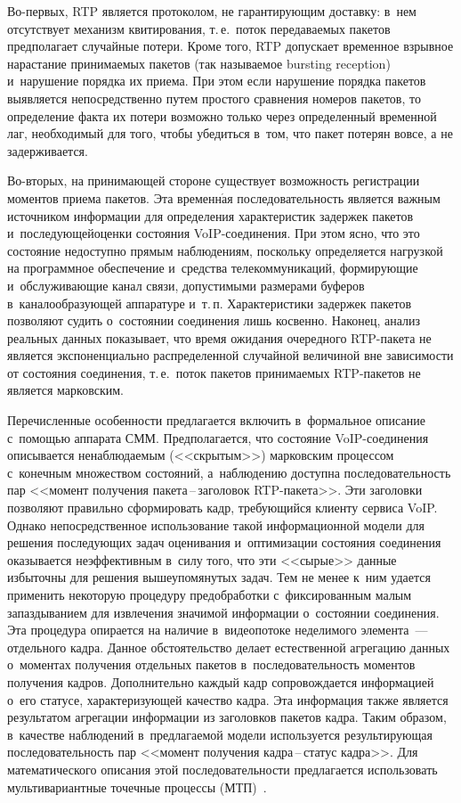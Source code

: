 \begin{multicols}{2}
Во-первых, RTP является протоколом, не гаран\-ти\-ру\-ющим доставку: в~нем
отсутствует механизм квитирования, т.\,е.\ поток передаваемых пакетов
предполагает случайные потери. Кроме того, RTP допускает временное
взрывное нарастание принимаемых пакетов (так называемое bursting reception) 
и~нарушение порядка их приема. При этом если нарушение порядка пакетов
выявляется непосредственно путем простого сравнения номеров пакетов,
то определение факта их потери возможно только через определенный
временной лаг, необходимый для того, чтобы убедиться в~том, что
пакет потерян вовсе, а не задерживается.

Во-вторых, на принимающей стороне существует возможность регистрации
моментов приема пакетов. Эта временн$\acute{\mbox{а}}$я последовательность является
важным источником информации для определения характеристик задержек
пакетов и~последующей\linebreak оценки состояния VoIP-со\-еди\-не\-ния. При этом
\mbox{ясно,} что это состояние недоступно прямым наблюдениям, поскольку
определяется нагрузкой на программное обеспечение и~средства
телекоммуникаций, формирующие и~обслуживающие канал связи,
допустимыми размерами буферов в~каналообразующей аппаратуре и~т.\,п.
Характеристики задержек пакетов позволяют судить о~состоянии
соединения лишь косвенно. Наконец, анализ реальных данных
показывает, что время ожидания очередного RTP-пакета не является
экспоненциально распределенной случайной величиной вне зависимости
от состояния соединения, т.\,е.\ поток пакетов принимаемых RTP-па\-ке\-тов
не является марковским.

Перечисленные особенности предлагается вклю\-чить в~формальное
описание с~помощью ап\-па\-ра\-та СММ. Предполагается, что состояние\linebreak
VoIP-со\-еди\-не\-ния описывается ненаблюдаемым (<<скрытым>>) марковским
процессом с~конечным множеством состояний, а~наблюдению доступна
последовательность пар <<момент получения па\-ке\-та\,--\,за\-го\-ло\-вок
RTP-па\-ке\-та>>. Эти заголовки позволяют правильно сформировать кадр,
требующийся клиенту сервиса VoIP. Однако непосредственное
использование такой информационной модели для решения последующих
задач оценивания и~оптимизации состояния соединения оказывается
неэффективным в~силу того, что эти <<сырые>> данные избыточны для
решения вышеупомянутых задач. Тем не менее к~ним удается применить
некоторую процедуру предобработки с~фиксированным малым
запаздыванием для извлечения значимой информации о~состоянии
соединения. Эта процедура опирается на наличие в~видеопотоке
неделимого элемента~--- отдельного кадра. Данное обстоятельство
делает естественной агрегацию данных о~моментах получения отдельных
пакетов в~последовательность моментов получения кадров.
Дополнительно каждый кадр сопровождается информацией о~его статусе,
характеризующей качество кадра. Эта информация также является
результатом агрегации информации из заголовков пакетов кадра. Таким
образом, в~качестве наблюдений в~предлагаемой модели используется
результирующая последовательность пар <<момент получения кад\-ра\,--\,ста\-тус кадра>>. Для математического описания этой последовательности
предлагается использовать мультивариантные точечные процессы (МТП)~\cite{LS_89}.


\end{multicols}
